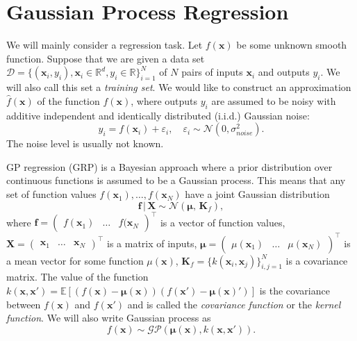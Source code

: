 
\section{Gaussian Process Regression}
\label{sec:intro}

We will mainly consider a regression task.
Let $f(\mathbf{x})$ be some unknown smooth function.
Suppose that we are given a data set
$\mathcal{D} = \{(\mathbf{x}_i, y_i), \mathbf{x}_i \in \mathbb{R}^d, y_i \in
\mathbb{R}\}_{i = 1}^N$
of $N$ pairs of inputs $\mathbf{x}_i$ and outputs $y_i$.
We will also call this set a {\em training set}.
We would like to construct an approximation $\hat{f}(\mathbf{x})$
of the function $f(\mathbf{x})$,
where outputs $y_i$ are assumed to be noisy with additive independent and identically distributed (i.i.d.) Gaussian noise:
\begin{equation}
    \label{eq:model}
      y_i = f(\mathbf{x}_i) + \varepsilon_i, \quad \varepsilon_i \sim \mathcal{N}(0, \sigma_{noise}^2).
\end{equation}
The noise level is usually not known.


GP regression (GRP) is a Bayesian approach where a prior distribution over continuous functions
is assumed to be a Gaussian process.
This means that any set of function values $f(\mathbf{x}_1), \ldots, f(\mathbf{x}_N)$
have a joint Gaussian distribution \citep{rasmussen2006gaussian}
\begin{equation}
  \label{eq:regression_problem}
  \mathbf{f} \, | \, \mathbf{X} \sim \mathcal{N}(\boldsymbol{\mu}, \, \mathbf{K}_f),
\end{equation}
where $\mathbf{f} = \begin{pmatrix}f(\mathbf{x}_1) & \ldots & f(\mathbf{x}_N\end{pmatrix}^\top$
is a vector of function values,
$\mathbf{X} = \begin{pmatrix}\mathbf{x}_1 & \ldots & \mathbf{x}_N\end{pmatrix}^\top$ is a matrix of inputs,
$\boldsymbol{\mu} =
\begin{pmatrix}\mu(\mathbf{x}_1) & \ldots & \mu(\mathbf{x}_N)\end{pmatrix}^\top$
is a mean vector for some function $\mu(\mathbf{x})$,
$\mathbf{K}_f = \{ k(\mathbf{x}_i, \mathbf{x}_j) \}_{i, j = 1}^N$ is a covariance matrix.
The value of the function $k(\mathbf{x, x}') = \mathbb{E}\left [
  (f(\mathbf{x}) - {\bm \mu}(\mathbf{x}))(f(\mathbf{x}') - {\bm \mu}(\mathbf{x})')
\right ]$ is the covariance between $f(\mathbf{x})$
and $f(\mathbf{x}')$ and is called the {\em covariance function} or the {\em kernel function}.
We will also write Gaussian process as
\[
  f(\mathbf{x}) \sim \mathcal{GP}({\bm \mu}(\mathbf{x}), k(\mathbf{x, x}')).
\]

